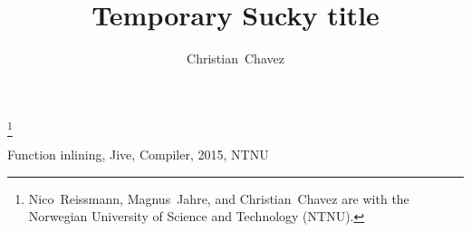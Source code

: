 \documentclass[journal, a4paper, twoside, romanappendices]{IEEEtran}
\begin{document}
\title{Temporary Sucky title}
\author{Christian~Chavez}
\maketitle

\thanks{Nico~Reissmann, Magnus~Jahre, and Christian~Chavez are with the
Norwegian University of Science and Technology (NTNU).}


\begin{IEEEkeywords}
Function inlining, Jive, Compiler, 2015, NTNU
\end{IEEEkeywords}


%








%
%
\end{document}
